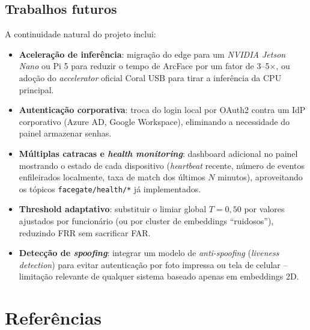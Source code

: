 \documentclass[12pt,a4paper]{report}
\begin{document}
\section{Trabalhos futuros}
\label{sec:trabalhos-futuros}

A continuidade natural do projeto inclui:

\begin{itemize}
    \item \textbf{Aceleração de inferência}: migração do edge para um
        \textit{NVIDIA Jetson Nano} ou Pi 5 para reduzir o tempo de
        ArcFace por um fator de 3--5$\times$, ou adoção do
        \textit{accelerator} oficial Coral USB para tirar a inferência
        da CPU principal.
    \item \textbf{Autenticação corporativa}: troca do login local por
        OAuth2 contra um IdP corporativo (Azure AD, Google Workspace),
        eliminando a necessidade do painel armazenar senhas.
    \item \textbf{Múltiplas catracas e \textit{health monitoring}}:
        dashboard adicional no painel mostrando o estado de cada
        dispositivo (\textit{heartbeat} recente, número de eventos
        enfileirados localmente, taxa de match dos últimos $N$
        minutos), aproveitando os tópicos
        \texttt{facegate/health/*} já implementados.
    \item \textbf{Threshold adaptativo}: substituir o limiar global
        $T = 0{,}50$ por valores ajustados por funcionário (ou por
        cluster de embeddings ``ruidosos''), reduzindo FRR sem
        sacrificar FAR.
    \item \textbf{Detecção de \textit{spoofing}}: integrar um modelo
        de \textit{anti-spoofing} (\textit{liveness detection})
        para evitar autenticação por foto impressa ou tela de
        celular -- limitação relevante de qualquer sistema baseado
        apenas em embeddings 2D.
\end{itemize}

\chapter*{Referências}
\end{document}
